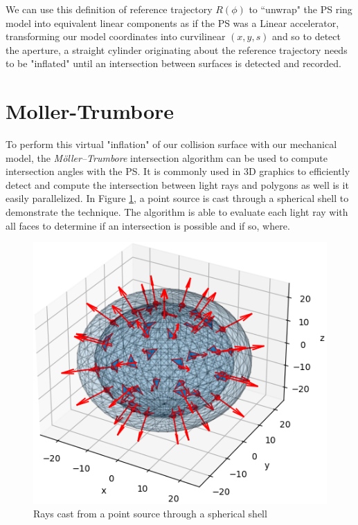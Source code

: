 We can use this definition of reference trajectory $R(\phi)$ to ``unwrap" the PS ring model into equivalent linear components as if the PS was a Linear accelerator, transforming our model coordinates into curvilinear $(x, y, s)$ and so to detect the aperture, a straight cylinder originating about the reference trajectory needs to be "inflated" until an intersection between surfaces is detected and recorded.

\section{Moller-Trumbore}

To perform this virtual "inflation" of our collision surface with our mechanical model, the \textit{Möller–Trumbore}\cite{moller_fast_1997} intersection algorithm can be used to compute intersection angles with the PS. It is commonly used in 3D graphics to efficiently detect and compute the intersection between light rays and polygons as well is it easily parallelized. In Figure  \ref{fig:ray_casting}, a point source is cast through a spherical shell to demonstrate the technique. The algorithm is able to evaluate each light ray with all faces to determine if an intersection is possible and if so, where.

\begin{figure}
    \centering
    \includegraphics{figs/ray_casting.png}
    \caption{Rays cast from a point source through a spherical shell}
    \label{fig:ray_casting}
\end{figure}

